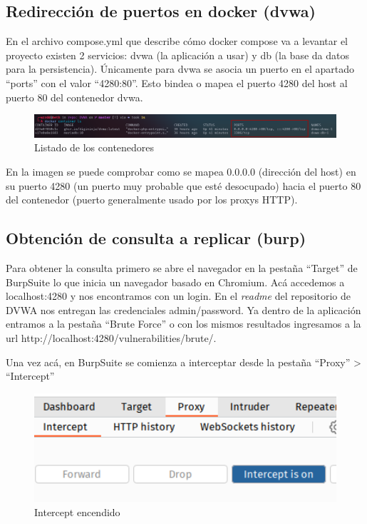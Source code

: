 \documentclass[letter,12pt]{article}
\begin{document}
\subsection{Redirección de puertos en docker (dvwa)}
En el archivo compose.yml que describe cómo docker compose va a levantar el
proyecto existen 2 servicios: dvwa (la aplicación a usar) y db (la base da datos
para la persistencia). Únicamente para dvwa se asocia un puerto en el apartado
``ports'' con el valor ``4280:80''. Esto bindea o mapea el puerto 4280 del host
al puerto 80 del contenedor dvwa.
\begin{figure}[H]
  \centering
  \includegraphics[width=17cm]{images/03-docker-port.png}
  \caption{Listado de los contenedores}
\end{figure}
En la imagen se puede comprobar como se mapea 0.0.0.0 (dirección del host) en su
puerto 4280 (un puerto muy probable que esté desocupado) hacia el puerto 80 del
contenedor (puerto generalmente usado por los proxys HTTP).

\subsection{Obtención de consulta a replicar (burp)}
Para obtener la consulta primero se abre el navegador en la pestaña ``Target''
de BurpSuite lo que inicia un navegador basado en Chromium. Acá accedemos a
localhost:4280 y nos encontramos con un login. En el \textit{readme} del
repositorio de DVWA nos entregan las credenciales admin/password. Ya dentro de
la aplicación entramos a la pestaña ``Brute Force'' o con los mismos resultados
ingresamos a la url http://localhost:4280/vulnerabilities/brute/.

Una vez acá, en BurpSuite se comienza a interceptar desde la pestaña ``Proxy''
\-> ``Intercept''
\begin{figure}[H]
  \centering
  \includegraphics[width=13cm]{images/08-intercept.png}
  \caption{Intercept encendido}
\end{figure}
\end{document}
